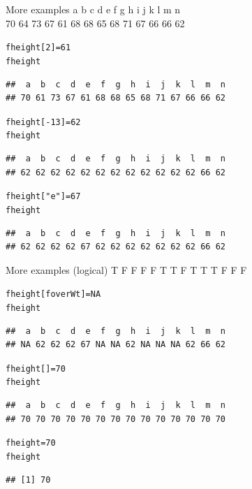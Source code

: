 \documentclass{beamer}\usepackage[]{graphicx}\usepackage[]{color}
\makeatletter
\newcommand{\hlnum}[1]{\textcolor[rgb]{0.686,0.059,0.569}{#1}}%
\newcommand{\hlstr}[1]{\textcolor[rgb]{0.192,0.494,0.8}{#1}}%
\newcommand{\hlopt}[1]{\textcolor[rgb]{0,0,0}{#1}}%
\newcommand{\hlstd}[1]{\textcolor[rgb]{0.345,0.345,0.345}{#1}}%
\newcommand{\hlkwb}[1]{\textcolor[rgb]{0.69,0.353,0.396}{#1}}%
\newenvironment{kframe}{%
 \def\at@end@of@kframe{}%
 \ifinner\ifhmode%
  \def\at@end@of@kframe{\end{minipage}}%
  \begin{minipage}{\columnwidth}%
 \fi\fi%
 \def\FrameCommand##1{\hskip\@totalleftmargin \hskip-\fboxsep
 \colorbox{shadecolor}{##1}\hskip-\fboxsep
     \hskip-\linewidth \hskip-\@totalleftmargin \hskip\columnwidth}%
 \MakeFramed {\advance\hsize-\width
   \@totalleftmargin\z@ \linewidth\hsize
   \@setminipage}}%
 {\par\unskip\endMakeFramed%
 \at@end@of@kframe}
\newenvironment{knitrout}{}{} %
\renewenvironment{knitrout}{\begin{singlespace}}{\end{singlespace}}
\theoremstyle{mystyle}
\makeatother
\begin{document}
\begin{frame}[fragile]{More examples}
 a  b  c  d  e  f  g  h  i  j  k  l  m  n \\
70 64 73 67 61 68 68 65 68 71 67 66 66 62 
\begin{knitrout}
\color{fgcolor}\begin{kframe}
\begin{alltt}
\hlstd{fheight[}\hlnum{2}\hlstd{]}\hlkwb{=}\hlnum{61}
\hlstd{fheight}
\end{alltt}
\begin{verbatim}
##  a  b  c  d  e  f  g  h  i  j  k  l  m  n 
## 70 61 73 67 61 68 68 65 68 71 67 66 66 62
\end{verbatim}
\begin{alltt}
\hlstd{fheight[}\hlopt{-}\hlnum{13}\hlstd{]}\hlkwb{=}\hlnum{62}
\hlstd{fheight}
\end{alltt}
\begin{verbatim}
##  a  b  c  d  e  f  g  h  i  j  k  l  m  n 
## 62 62 62 62 62 62 62 62 62 62 62 62 66 62
\end{verbatim}
\begin{alltt}
\hlstd{fheight[}\hlstr{"e"}\hlstd{]}\hlkwb{=}\hlnum{67}
\hlstd{fheight}
\end{alltt}
\begin{verbatim}
##  a  b  c  d  e  f  g  h  i  j  k  l  m  n 
## 62 62 62 62 67 62 62 62 62 62 62 62 66 62
\end{verbatim}
\end{kframe}
\end{knitrout}

\end{frame}

\begin{frame}[fragile]{More examples (logical)}
T    F    F    F    F    T     T     F   T      T     T   F    F    F
\begin{knitrout}
\color{fgcolor}\begin{kframe}
\begin{alltt}
\hlstd{fheight[foverWt]}\hlkwb{=}\hlnum{NA}
\hlstd{fheight}
\end{alltt}
\begin{verbatim}
##  a  b  c  d  e  f  g  h  i  j  k  l  m  n 
## NA 62 62 62 67 NA NA 62 NA NA NA 62 66 62
\end{verbatim}
\begin{alltt}
\hlstd{fheight[]}\hlkwb{=}\hlnum{70}
\hlstd{fheight}
\end{alltt}
\begin{verbatim}
##  a  b  c  d  e  f  g  h  i  j  k  l  m  n 
## 70 70 70 70 70 70 70 70 70 70 70 70 70 70
\end{verbatim}
\begin{alltt}
\hlstd{fheight}\hlkwb{=}\hlnum{70}
\hlstd{fheight}
\end{alltt}
\begin{verbatim}
## [1] 70
\end{verbatim}
\end{kframe}
\end{knitrout}
\end{frame}
\end{document}
